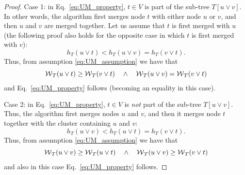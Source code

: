 \begin{proof}
Case 1: in Eq.~\ref{eq:UM_property}, $t\in V$ is part of the sub-tree ${T[u \vee v]}$. In other words, the algorithm first merges node $t$ with either node $u$ or $v$, and then $u$ and $v$ are merged together. Let us assume that $t$ is first merged with $u$ (the following proof also holds for the opposite case in which $t$ is first merged with $v$):
\begin{equation}
h_T(u \vee t) < h_T(u \vee v) = h_T(v \vee t).
\end{equation}
Thus, from assumption \ref{eq:UM_assumption} we have that
\begin{equation}
\mathcal{W}{}_{T}(u \vee t) \geq \mathcal{W}{}_{T}(v \vee t) \quad  \wedge \quad \mathcal{W}{}_{T}(u \vee v) = \mathcal{W}{}_{T}(v \vee t)
\end{equation}
and Eq.~\ref{eq:UM_property} follows (becoming an equality in this case).

Case 2: in Eq.~\ref{eq:UM_property}, $t\in V$ is \emph{not} part of the sub-tree ${T[u \vee v]}$. Thus, the algorithm first merges nodes $u$ and $v$, and then it merges node $t$ together with the cluster containing $u$ and $v$:
\begin{equation}
h_T(u \vee v) < h_T(u \vee t) = h_T(v \vee t).
\end{equation}
Thus, from assumption \ref{eq:UM_assumption} we have that
\begin{equation}
\mathcal{W}{}_{T}(u \vee v) \geq \mathcal{W}{}_{T}(u \vee t) \quad  \wedge \quad \mathcal{W}{}_{T}(u \vee v) \geq \mathcal{W}{}_{T}(v \vee t)
\end{equation}
and also in this case Eq.~\ref{eq:UM_property} follows.


\end{proof}
